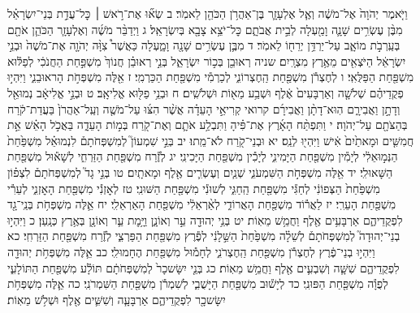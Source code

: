\documentclass[twoside, openany, parskip=half, 11pt]{book}
\begin{document}
וַיֹּ֤אמֶר יְהֹוָה֙ אֶל־מֹשֶׁ֔ה וְאֶ֧ל אֶלְעָזָ֛ר בֶּן־אַהֲרֹ֥ן הַכֹּהֵ֖ן לֵאמֹֽר׃ ב שְׂא֞וּ אֶת־רֹ֣אשׁ ׀ כׇּל־עֲדַ֣ת בְּנֵי־יִשְׂרָאֵ֗ל מִבֶּ֨ן עֶשְׂרִ֥ים שָׁנָ֛ה וָמַ֖עְלָה לְבֵ֣ית אֲבֹתָ֑ם כׇּל־יֹצֵ֥א צָבָ֖א בְּיִשְׂרָאֵֽל׃ ג וַיְדַבֵּ֨ר מֹשֶׁ֜ה וְאֶלְעָזָ֧ר הַכֹּהֵ֛ן אֹתָ֖ם בְּעַֽרְבֹ֣ת מוֹאָ֑ב עַל־יַרְדֵּ֥ן יְרֵח֖וֹ לֵאמֹֽר׃ ד מִבֶּ֛ן עֶשְׂרִ֥ים שָׁנָ֖ה וָמָ֑עְלָה כַּאֲשֶׁר֩ צִוָּ֨ה יְהֹוָ֤ה אֶת־מֹשֶׁה֙ וּבְנֵ֣י יִשְׂרָאֵ֔ל הַיֹּצְאִ֖ים מֵאֶ֥רֶץ מִצְרָֽיִם׃ שניה רְאוּבֵ֖ן בְּכ֣וֹר יִשְׂרָאֵ֑ל בְּנֵ֣י רְאוּבֵ֗ן חֲנוֹךְ֙ מִשְׁפַּ֣חַת הַחֲנֹכִ֔י לְפַלּ֕וּא מִשְׁפַּ֖חַת הַפַּלֻּאִֽי׃ ו לְחֶצְרֹ֕ן מִשְׁפַּ֖חַת הַֽחֶצְרוֹנִ֑י לְכַרְמִ֕י מִשְׁפַּ֖חַת הַכַּרְמִֽי׃ ז אֵ֖לֶּה מִשְׁפְּחֹ֣ת הָראוּבֵנִ֑י וַיִּהְי֣וּ פְקֻדֵיהֶ֗ם שְׁלֹשָׁ֤ה וְאַרְבָּעִים֙ אֶ֔לֶף וּשְׁבַ֥ע מֵא֖וֹת וּשְׁלֹשִֽׁים׃ ח וּבְנֵ֥י פַלּ֖וּא אֱלִיאָֽב׃ ט וּבְנֵ֣י אֱלִיאָ֔ב נְמוּאֵ֖ל וְדָתָ֣ן וַאֲבִירָ֑ם הֽוּא־דָתָ֨ן וַאֲבִירָ֜ם קרואי קְרִיאֵ֣י הָעֵדָ֗ה אֲשֶׁ֨ר הִצּ֜וּ עַל־מֹשֶׁ֤ה וְעַֽל־אַהֲרֹן֙ בַּעֲדַת־קֹ֔רַח בְּהַצֹּתָ֖ם עַל־יְהֹוָה׃ י וַתִּפְתַּ֨ח הָאָ֜רֶץ אֶת־פִּ֗יהָ וַתִּבְלַ֥ע אֹתָ֛ם וְאֶת־קֹ֖רַח בְּמ֣וֹת הָעֵדָ֑ה בַּאֲכֹ֣ל הָאֵ֗שׁ אֵ֣ת חֲמִשִּׁ֤ים וּמָאתַ֙יִם֙ אִ֔ישׁ וַיִּהְי֖וּ לְנֵֽס׃ יא וּבְנֵי־קֹ֖רַח לֹא־מֵֽתוּ׃
יב בְּנֵ֣י שִׁמְעוֹן֮ לְמִשְׁפְּחֹתָם֒ לִנְמוּאֵ֗ל מִשְׁפַּ֙חַת֙ הַנְּמ֣וּאֵלִ֔י לְיָמִ֕ין מִשְׁפַּ֖חַת הַיָּמִינִ֑י לְיָכִ֕ין מִשְׁפַּ֖חַת הַיָּכִינִֽי׃ יג לְזֶ֕רַח מִשְׁפַּ֖חַת הַזַּרְחִ֑י לְשָׁא֕וּל מִשְׁפַּ֖חַת הַשָּׁאוּלִֽי׃ יד אֵ֖לֶּה מִשְׁפְּחֹ֣ת הַשִּׁמְעֹנִ֑י שְׁנַ֧יִם וְעֶשְׂרִ֛ים אֶ֖לֶף וּמָאתָֽיִם׃
טו בְּנֵ֣י גָד֮ לְמִשְׁפְּחֹתָם֒ לִצְפ֗וֹן מִשְׁפַּ֙חַת֙ הַצְּפוֹנִ֔י לְחַגִּ֕י מִשְׁפַּ֖חַת הַֽחַגִּ֑י לְשׁוּנִ֕י מִשְׁפַּ֖חַת הַשּׁוּנִֽי׃ טז לְאׇזְנִ֕י מִשְׁפַּ֖חַת הָאׇזְנִ֑י לְעֵרִ֕י מִשְׁפַּ֖חַת הָעֵרִֽי׃ יז לַאֲר֕וֹד מִשְׁפַּ֖חַת הָאֲרוֹדִ֑י לְאַ֨רְאֵלִ֔י מִשְׁפַּ֖חַת הָאַרְאֵלִֽי׃ יח אֵ֛לֶּה מִשְׁפְּחֹ֥ת בְּנֵֽי־גָ֖ד לִפְקֻדֵיהֶ֑ם אַרְבָּעִ֥ים אֶ֖לֶף וַחֲמֵ֥שׁ מֵאֽוֹת׃
יט בְּנֵ֥י יְהוּדָ֖ה עֵ֣ר וְאוֹנָ֑ן וַיָּ֥מׇת עֵ֛ר וְאוֹנָ֖ן בְּאֶ֥רֶץ כְּנָֽעַן׃ כ וַיִּהְי֣וּ בְנֵי־יְהוּדָה֮ לְמִשְׁפְּחֹתָם֒ לְשֵׁלָ֗ה מִשְׁפַּ֙חַת֙ הַשֵּׁ֣לָנִ֔י לְפֶ֕רֶץ מִשְׁפַּ֖חַת הַפַּרְצִ֑י לְזֶ֕רַח מִשְׁפַּ֖חַת הַזַּרְחִֽי׃ כא וַיִּהְי֣וּ בְנֵי־פֶ֔רֶץ לְחֶצְרֹ֕ן מִשְׁפַּ֖חַת הַֽחֶצְרֹנִ֑י לְחָמ֕וּל מִשְׁפַּ֖חַת הֶחָמוּלִֽי׃ כב אֵ֛לֶּה מִשְׁפְּחֹ֥ת יְהוּדָ֖ה לִפְקֻדֵיהֶ֑ם שִׁשָּׁ֧ה וְשִׁבְעִ֛ים אֶ֖לֶף וַחֲמֵ֥שׁ מֵאֽוֹת׃
כג בְּנֵ֤י יִשָּׂשכָר֙ לְמִשְׁפְּחֹתָ֔ם תּוֹלָ֕ע מִשְׁפַּ֖חַת הַתּוֹלָעִ֑י לְפֻוָ֕ה מִשְׁפַּ֖חַת הַפּוּנִֽי׃ כד לְיָשׁ֕וּב מִשְׁפַּ֖חַת הַיָּשֻׁבִ֑י לְשִׁמְרֹ֕ן מִשְׁפַּ֖חַת הַשִּׁמְרֹנִֽי׃ כה אֵ֛לֶּה מִשְׁפְּחֹ֥ת יִשָּׂשכָ֖ר לִפְקֻדֵיהֶ֑ם אַרְבָּעָ֧ה וְשִׁשִּׁ֛ים אֶ֖לֶף וּשְׁלֹ֥שׁ מֵאֽוֹת׃
\end{document}
